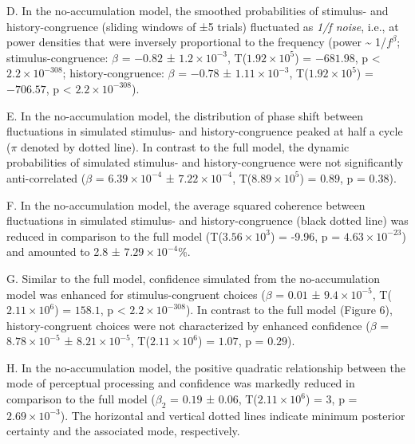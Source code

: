\documentclass[
]{article}
\begin{document}
D. In the no-accumulation model, the smoothed probabilities of stimulus-
and history-congruence (sliding windows of ±5 trials) fluctuated as
\emph{1/f noise}, i.e., at power densities that were inversely
proportional to the frequency (power \textasciitilde{} 1/\(f^\beta\);
stimulus-congruence: \(\beta\) = \(-0.82\) ±
\(\ensuremath{1.2\times 10^{-3}}\),
T(\(\ensuremath{1.92\times 10^{5}}\)) = \(-681.98\), p < \(\ensuremath{2.2\times 10^{-308}}\);
history-congruence: \(\beta\) = \(-0.78\) ±
\(\ensuremath{1.11\times 10^{-3}}\),
T(\(\ensuremath{1.92\times 10^{5}}\)) = \(-706.57\), p < \(\ensuremath{2.2\times 10^{-308}}\)).

E. In the no-accumulation model, the distribution of phase shift between
fluctuations in simulated stimulus- and history-congruence peaked at
half a cycle (\(\pi\) denoted by dotted line). In contrast to the full
model, the dynamic probabilities of simulated stimulus- and
history-congruence were not significantly anti-correlated (\(\beta\) =
\(\ensuremath{6.39\times 10^{-4}}\) ±
\(\ensuremath{7.22\times 10^{-4}}\),
T(\(\ensuremath{8.89\times 10^{5}}\)) = \(0.89\), p = \(0.38\)).

F. In the no-accumulation model, the average squared coherence between
fluctuations in simulated stimulus- and history-congruence (black dotted
line) was reduced in comparison to the full model
(T(\ensuremath{3.56\times 10^{3}}) = -9.96, p =
\(\ensuremath{4.63\times 10^{-23}}\)) and amounted to 2.8 ±
\ensuremath{7.29\times 10^{-4}}\%.

G. Similar to the full model, confidence simulated from the
no-accumulation model was enhanced for stimulus-congruent choices
(\(\beta\) = \(0.01\) ± \(\ensuremath{9.4\times 10^{-5}}\),
T(\(\ensuremath{2.11\times 10^{6}}\)) = \(158.1\), p < \(\ensuremath{2.2\times 10^{-308}}\)). In
contrast to the full model (Figure 6), history-congruent choices were
not characterized by enhanced confidence (\(\beta\) =
\(\ensuremath{8.78\times 10^{-5}}\) ±
\(\ensuremath{8.21\times 10^{-5}}\),
T(\(\ensuremath{2.11\times 10^{6}}\)) = \(1.07\), p = \(0.29\)).

H. In the no-accumulation model, the positive quadratic relationship
between the mode of perceptual processing and confidence was markedly
reduced in comparison to the full model (\(\beta_2\) = \(0.19\) ±
\(0.06\), T(\(\ensuremath{2.11\times 10^{6}}\)) = \(3\), p =
\(\ensuremath{2.69\times 10^{-3}}\)). The horizontal and vertical dotted
lines indicate minimum posterior certainty and the associated mode,
respectively.
\end{document}
